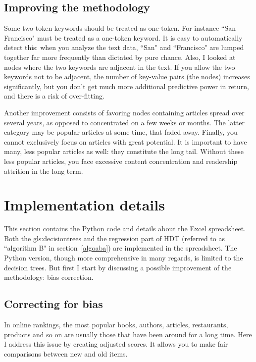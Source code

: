 \documentclass[oneside,10pt]{book}
\begin{document}
\subsection{Improving the methodology}\label{ccvcx}

Some two-token keywords should be treated as one-token. For instance ``San Francisco" must be treated as a one-token keyword. It is easy to automatically detect this: when you analyze the text data, ``San" and ``Francisco" are lumped together far more frequently than dictated by pure chance.
Also, I looked at nodes  where the two keywords are adjacent in the text. If you allow the two keywords not to be adjacent, the number of key-value pairs (the nodes) increases significantly, but you don't get much more additional predictive power in return, and there is a risk of over-fitting.


Another improvement consists of favoring nodes containing articles spread over several years, as opposed to concentrated on a few weeks or months. The latter category may be popular articles at some time, that faded away.
Finally, you cannot exclusively focus on articles with great potential. It is important to have many, less popular articles as well: they constitute the long tail. Without these less popular articles, you face excessive content concentration and readership attrition in the long term.

\section{Implementation details}

This section contains the Python code and details about the Excel spreadsheet. Both the \glspl{gls:decisiontree} and the regression part of HDT (referred to as ``algorithm B" in section~\ref{algoaba}) are implemented in the spreadsheet. The Python version, though more comprehensive in many regards, is limited to the decision trees. But first
I start by discussing a possible improvement of the methodology: bias correction.

\subsection{Correcting for bias}\label{timeab}

In online rankings, the most popular books, authors, articles, restaurants, products and so on are usually those that have been around for a long time.
Here I address this issue by creating adjusted scores. It allows you to make fair comparisons between new and old items.
\end{document}
